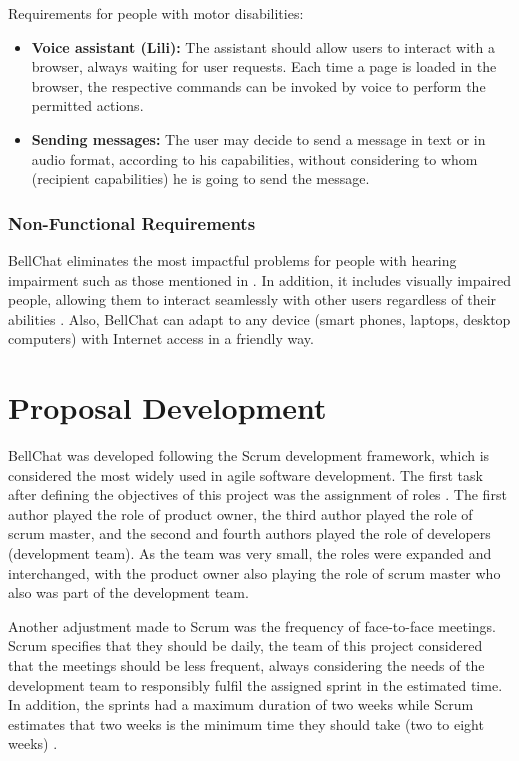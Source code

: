 \documentclass{svproc}
\begin{document}
Requirements for people with motor disabilities: 

\begin{itemize}
	\item \textbf{Voice assistant (Lili): }The assistant should allow users to interact with a browser, always waiting for user requests. Each time a page is loaded in the browser, the respective commands can be invoked by voice to perform the permitted actions.
	\item \textbf{Sending messages: }The user may decide to send a message in text or in audio format, according to his capabilities, without considering to whom (recipient capabilities) he is going to send the message.
\end{itemize}

\subsubsection{Non-Functional Requirements}
BellChat eliminates the most impactful problems for people with hearing impairment such as those mentioned in \cite{Pascual2015}. In addition, it includes visually impaired people, allowing them to interact seamlessly with other users regardless of their abilities \cite{AlGhurair2021}. Also, BellChat can adapt to any device (smart phones, laptops, desktop computers) with Internet access in a friendly way.

\section{Proposal Development}

BellChat was developed following the Scrum development framework, which is considered the most widely used in agile software development. The first task after defining the objectives of this project was the assignment of roles \cite{Schwaber2011}. The first author played the role of product owner, the third author played the role of scrum master, and the second and fourth authors played the role of developers (development team). As the team was very small, the roles were expanded and interchanged, with the product owner also playing the role of scrum master who also was part of the development team.

Another adjustment made to Scrum was the frequency of face-to-face meetings. Scrum specifies that they should be daily, the team of this project considered that the meetings should be less frequent, always considering the needs of the development team to responsibly fulfil the assigned sprint in the estimated time. In addition, the sprints had a maximum duration of two weeks while Scrum estimates that two weeks is the minimum time they should take (two to eight weeks) \cite{Rising2000,Schwaber2011,ScrumORG2019}.
\end{document}
